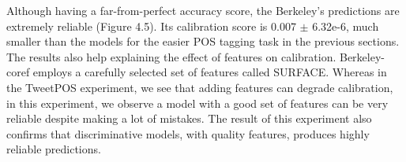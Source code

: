 Although having a far-from-perfect accuracy score, the Berkeley's predictions are extremely reliable (Figure 4.5). Its calibration score is 0.007 $\pm$ 6.32e-6, much smaller than the models for the easier POS tagging task in the previous sections. The results also help explaining the effect of features on calibration. Berkeley-coref employs a carefully selected set of features called SURFACE. Whereas in the TweetPOS experiment, we see that adding features can degrade calibration, in this experiment, we observe a model with a good set of features can be very reliable despite making a lot of mistakes. The result of this experiment also confirms that discriminative models, with quality features, produces highly reliable predictions.    

